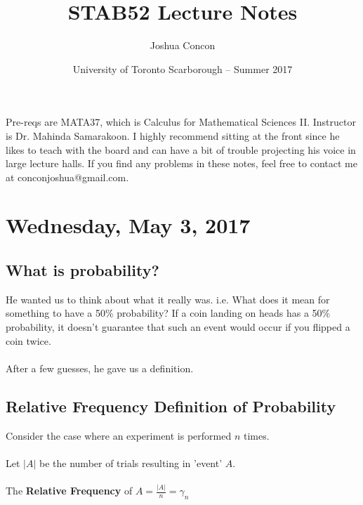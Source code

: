 \documentclass[12pt]{article}
\begin{document}
\title{STAB52 Lecture Notes}
\date{University of Toronto Scarborough -- Summer 2017}
\author{Joshua Concon}
\maketitle

Pre-reqs are MATA37, which is Calculus for Mathematical Sciences II.
Instructor is Dr. Mahinda Samarakoon. I highly recommend sitting at the front since he likes to teach with the board and can have a bit of trouble projecting his voice in large lecture halls. If you find any problems in these notes, feel free to contact me at conconjoshua@gmail.com.

\tableofcontents

\pagebreak

\section{Wednesday, May 3, 2017}

\subsection{What is probability?}

He wanted us to think about what it really was. i.e. What does it mean for something to have a 50\% probability? If a coin landing on heads has a 50\% probability, it doesn't guarantee that such an event would occur if you flipped a coin twice.\\
\\
After a few guesses, he gave us a definition.

\subsection{Relative Frequency Definition of Probability}

\begin{tcolorbox}[title=Relative Frequency]

Consider the case where an experiment is performed $n$ times.\\
\\
Let $|A|$ be the number of trials resulting in 'event' $A$.\\
\\
The \textbf{Relative Frequency} of $A = \frac{|A|}{n} = \gamma_n$\\

\end{tcolorbox}
\end{document}
